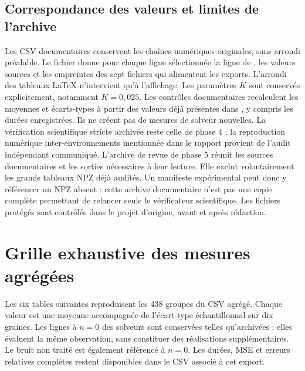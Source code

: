 \section{Correspondance des valeurs et limites de l'archive}
Les CSV documentaires conservent les chaînes numériques originales,
sans arrondi préalable. Le fichier
 donne pour chaque ligne
sélectionnée la ligne de , les valeurs sources et
les empreintes des sept fichiers qui alimentent les exports. L'arrondi
des tableaux LaTeX n'intervient qu'à l'affichage. Les paramètres $K$
sont conservés explicitement, notamment $K=0{,}025$.
Les contrôles documentaires recalculent les moyennes et écarts-types
à partir des valeurs déjà présentes dans , y compris
les durées enregistrées. Ils ne créent pas de mesures de solveur nouvelles.
La vérification scientifique stricte archivée reste celle de phase 4 ;
la reproduction numérique inter-environnements mentionnée dans le
rapport provient de l'audit indépendant communiqué.
L'archive de revue de phase 5 réunit les sources documentaires et les
sorties nécessaires à leur lecture. Elle exclut volontairement les
grands tableaux NPZ déjà audités. Un manifeste expérimental peut donc
y référencer un NPZ absent : cette archive documentaire n'est pas une
copie complète permettant de relancer seule le vérificateur scientifique.
Les fichiers protégés sont contrôlés dans le projet d'origine, avant
et après rédaction.

\chapter{Grille exhaustive des mesures agrégées}
\label{app:all-tables}
Les six tables suivantes reproduisent les 438 groupes du CSV agrégé.
Chaque valeur est une moyenne accompagnée de l'écart-type
échantillonnal sur dix graines. Les lignes à $n=0$ des solveurs sont
conservées telles qu'archivées : elles évaluent la même observation,
sans constituer des réalisations supplémentaires. Le bruit non traité
est également référencé à $n=0$. Les durées, MSE et erreurs relatives
complètes restent disponibles dans le CSV associé à cet export.

